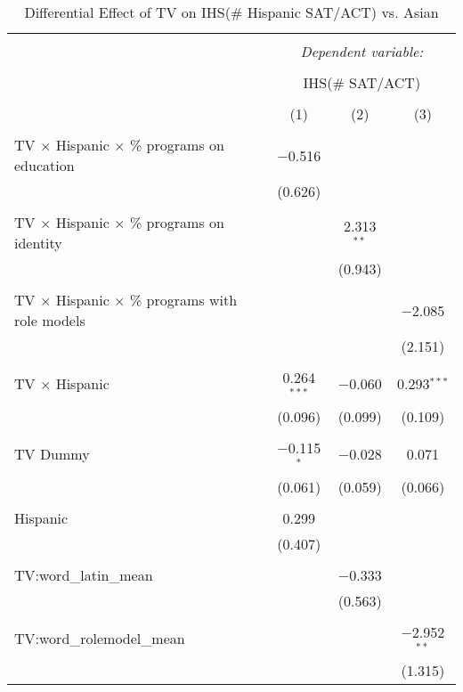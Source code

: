 
\begin{table}[!htbp] \centering 
  \caption{Differential Effect of TV on IHS(\# Hispanic SAT/ACT) vs. Asian} 
  \label{} 
\begin{tabular}{@{\extracolsep{-2pt}}lccc} 
\\[-1.8ex]\hline 
\hline \\[-1.8ex] 
 & \multicolumn{3}{c}{\textit{Dependent variable:}} \\ 
\cline{2-4} 
\\[-1.8ex] & \multicolumn{3}{c}{IHS(\# SAT/ACT)} \\ 
\\[-1.8ex] & (1) & (2) & (3)\\ 
\hline \\[-1.8ex] 
 TV $\times$ Hispanic $\times$ \% programs on education & $-$0.516 &  &  \\ 
  & (0.626) &  &  \\ 
  & & & \\ 
 TV $\times$ Hispanic $\times$ \% programs on identity &  & 2.313$^{**}$ &  \\ 
  &  & (0.943) &  \\ 
  & & & \\ 
 TV $\times$ Hispanic $\times$ \% programs with role models &  &  & $-$2.085 \\ 
  &  &  & (2.151) \\ 
  & & & \\ 
 TV $\times$ Hispanic & 0.264$^{***}$ & $-$0.060 & 0.293$^{***}$ \\ 
  & (0.096) & (0.099) & (0.109) \\ 
  & & & \\ 
 TV Dummy & $-$0.115$^{*}$ & $-$0.028 & 0.071 \\ 
  & (0.061) & (0.059) & (0.066) \\ 
  & & & \\ 
 Hispanic & 0.299 &  &  \\ 
  & (0.407) &  &  \\ 
  & & & \\ 
 TV:word\_latin\_mean &  & $-$0.333 &  \\ 
  &  & (0.563) &  \\ 
  & & & \\ 
 TV:word\_rolemodel\_mean &  &  & $-$2.952$^{**}$ \\ 
  &  &  & (1.315) \\ 

\end{tabular}
\end{table}
